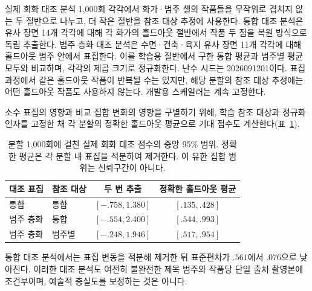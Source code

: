 \documentclass[11pt,a4paper]{article}
\begin{document}
실제 회화 대조 분석 1,000회 각각에서 화가·범주 셀의 작품들을 무작위로 겹치지 않는 두 절반으로 나누고, 더 작은 절반을 참조 대상 추정에 사용한다. 통합 대조 분석은 유사 장면 14개 각각에 대해 각 화가의 홀드아웃 절반에서 작품 두 점을 복원 방식으로 독립 추출한다. 범주 층화 대조 분석은 수면·건축·육지 유사 장면 11개 각각에 대해 홀드아웃 범주 안에서 표집한다. 이를 학습용 절반에서 구한 통합 평균과 범주별 평균 모두와 비교하며, 각각의 제곱 크기로 정규화한다. 난수 시드는 2026091201이다. 표집 과정에서 같은 홀드아웃 작품이 반복될 수는 있지만, 해당 분할의 참조 대상 추정에는 어떤 홀드아웃 작품도 사용하지 않는다. 개발용 스케일러는 계속 고정한다.

소수 표집의 영향과 비교 집합 변화의 영향을 구별하기 위해, 학습 참조 대상과 정규화 인자를 고정한 채 각 분할의 정확한 홀드아웃 평균으로 기대 점수도 계산한다(표~\ref{tab:painting-control-ranges}).

\begin{table}[H]
\centering\small
\begin{tabular}{@{}llcc@{}}
\toprule
대조 표집 & 참조 대상 & 두 번 추출 & 정확한 홀드아웃 평균\\\midrule
통합 & 통합 & $[-.758,1.380]$ & $[.135,.428]$\\
범주 층화 & 통합 & $[-.554,2.400]$ & $[.544,.993]$\\
범주 층화 & 범주별 & $[-.248,1.946]$ & $[.517,.954]$\\
\bottomrule
\end{tabular}
\caption{분할 1,000회에 걸친 실제 회화 대조 점수의 중앙 95\% 범위. 정확한 평균은 각 분할 내 표집을 적분하여 제거한다. 이 유한 집합 범위는 신뢰구간이 아니다.}
\label{tab:painting-control-ranges}
\end{table}

통합 대조 분석에서는 표집 변동을 적분해 제거한 뒤 표준편차가 $.561$에서 $.076$으로 낮아진다. 이러한 대조 분석도 여전히 불완전한 제목 범주와 작품당 단일 출처 촬영본에 조건부이며, 예술적 충실도를 보정하는 것은 아니다.
\end{document}
